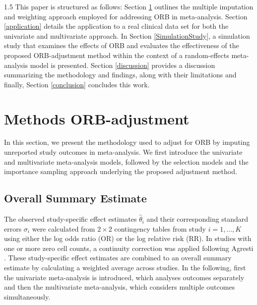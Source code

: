 \documentclass{article}
\begin{document}
\begin{spacing}{1.5}
This paper is structured as follows: Section \ref{Methods} outlines the multiple imputation and weighting approach employed for addressing ORB in meta-analysis. Section \ref{application} details the application to a real clinical data set for both the univariate and multivariate approach. In Section \ref{SimulationStudy}, a simulation study that examines the effects of ORB and evaluates the effectiveness of the proposed ORB-adjustment method within the context of a random-effects meta-analysis model is presented. Section \ref{discussion} provides a discussion summarizing the methodology and findings, along with their limitations and finally, Section \ref{conclusion} concludes this work.


\section{Methods ORB-adjustment} \label{Methods}

In this section, we present the methodology used to adjust for ORB by imputing unreported study outcomes in meta-analysis. We first introduce the univariate and multivariate meta-analysis models, followed by the selection models and the importance sampling approach underlying the proposed adjustment method.

\subsection{Overall Summary Estimate}
The observed study-specific effect estimates $\hat\theta_i$ and their corresponding standard errors $\sigma_i$ were calculated from $2 \times 2$ contingency tables from study $i = 1, \dots, K$ using either the log odds ratio (OR) or the log relative risk (RR). In studies with one or more zero cell counts, a continuity correction was applied following Agresti \cite[p. 71]{agresti2013categorical}. These study-specific effect estimates are combined to an overall summary estimate by calculating a weighted average across studies. In the following, first the univariate meta-analysis is introduced, which analyses outcomes separately and then the multivariate meta-analysis, which considers multiple outcomes simultaneously. 


\end{spacing}
\end{document}

